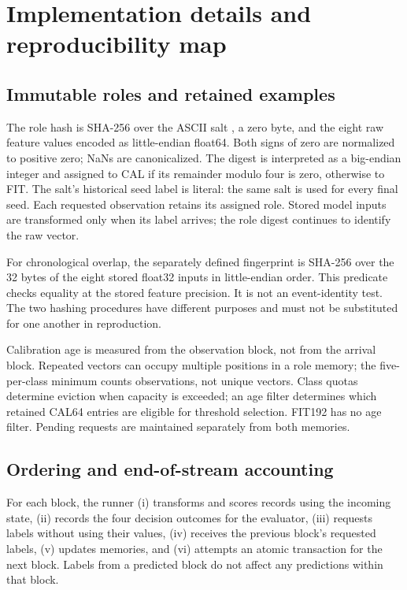 \section{Implementation details and reproducibility map}
\label{sec:implementation}
\subsection{Immutable roles and retained examples}
The role hash is SHA-256 over the ASCII salt , a zero byte, and the eight raw feature values encoded as little-endian float64. Both signs of zero are normalized to positive zero; NaNs are canonicalized. The digest is interpreted as a big-endian integer and assigned to CAL if its remainder modulo four is zero, otherwise to FIT. The salt's historical seed label is literal: the same salt is used for every final seed. Each requested observation retains its assigned role. Stored model inputs are transformed only when its label arrives; the role digest continues to identify the raw vector.

For chronological overlap, the separately defined fingerprint is SHA-256 over the 32 bytes of the eight stored float32 inputs in little-endian order. This predicate checks equality at the stored feature precision. It is not an event-identity test. The two hashing procedures have different purposes and must not be substituted for one another in reproduction.

Calibration age is measured from the observation block, not from the arrival block. Repeated vectors can occupy multiple positions in a role memory; the five-per-class minimum counts observations, not unique vectors. Class quotas determine eviction when capacity is exceeded; an age filter determines which retained CAL64 entries are eligible for threshold selection. FIT192 has no age filter. Pending requests are maintained separately from both memories.

\subsection{Ordering and end-of-stream accounting}
For each block, the runner (i) transforms and scores records using the incoming state, (ii) records the four decision outcomes for the evaluator, (iii) requests labels without using their values, (iv) receives the previous block's requested labels, (v) updates memories, and (vi) attempts an atomic transaction for the next block. Labels from a predicted block do not affect any predictions within that block.

